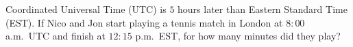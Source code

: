 Coordinated Universal Time (UTC) is $5$ hours later than Eastern Standard Time (EST). If Nico and Jon start playing a tennis match in London at $8{:}00$ a.m.\ UTC and finish at $12{:}15$ p.m.\ EST, for how many minutes did they play?
